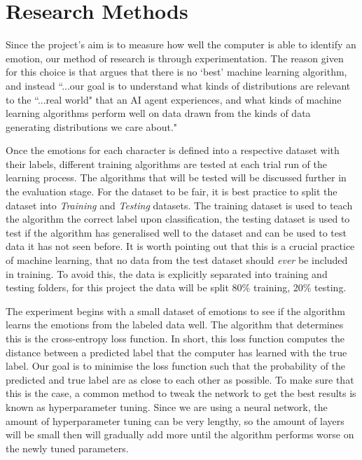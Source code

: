 \documentclass[report, 11pt, oneside]{dissertation}
\begin{document}
\section{Research Methods}

Since the project's aim is to measure how well the computer is able to identify an emotion, our method of research is through experimentation. The reason given for this choice is that \citep{Goodfellow-et-al-2016} argues that there is no `best' machine learning algorithm, and instead ``...our goal is to understand what kinds of distributions are relevant to the ``...real world" that an AI agent experiences, and what kinds of machine learning algorithms perform well on data drawn from the kinds of data generating distributions we care about."\citep[115]{Goodfellow-et-al-2016}

 Once the emotions for each character is defined into a respective dataset with their labels, different training algorithms are tested at each trial run of the learning process. The algorithms that will be tested will be discussed further in the evaluation stage. For the dataset to be fair, it is best practice to split the dataset into \textit{Training} and \textit{Testing} datasets. The training dataset is used to teach the algorithm the correct label upon classification, the testing dataset is used to test if the algorithm has generalised well to the dataset and can be used to test data it has not seen before. It is worth pointing out that this is a crucial practice of machine learning, that no data from the test dataset should \textit{ever} be included in training. To avoid this, the data is explicitly separated into training and testing folders, for this project the data will be split 80\% training, 20\% testing.

The experiment begins with a small dataset of emotions to see if the algorithm learns the emotions from the labeled data well. The algorithm that determines this is the cross-entropy loss function. In short, this loss function computes the distance between a predicted label that the computer has learned with the true label. Our goal is to minimise the loss function such that the probability of the predicted and true label are as close to each other as possible. To make sure that this is the case, a common method to tweak the network to get the best results is known as hyperparameter tuning. Since we are using a neural network, the amount of hyperparameter tuning can be very lengthy, so the amount of layers will be small then will gradually add more until the algorithm performs worse on the newly tuned parameters.
\end{document}
